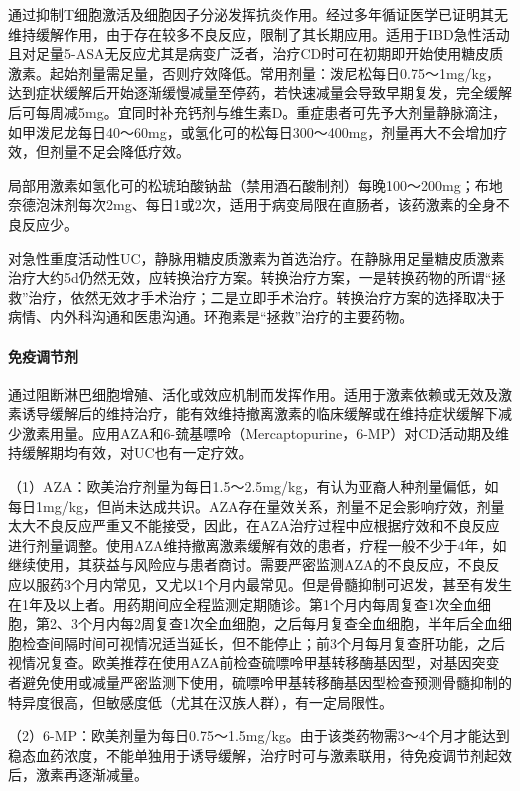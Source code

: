 通过抑制T细胞激活及细胞因子分泌发挥抗炎作用。经过多年循证医学已证明其无维持缓解作用，由于存在较多不良反应，限制了其长期应用。适用于IBD急性活动且对足量5-ASA无反应尤其是病变广泛者，治疗CD时可在初期即开始使用糖皮质激素。起始剂量需足量，否则疗效降低。常用剂量：泼尼松每日0.75～1mg/kg，达到症状缓解后开始逐渐缓慢减量至停药，若快速减量会导致早期复发，完全缓解后可每周减5mg。宜同时补充钙剂与维生素D。重症患者可先予大剂量静脉滴注，如甲泼尼龙每日40～60mg，或氢化可的松每日300～400mg，剂量再大不会增加疗效，但剂量不足会降低疗效。

局部用激素如氢化可的松琥珀酸钠盐（禁用酒石酸制剂）每晚100～200mg；布地奈德泡沫剂每次2mg、每日1或2次，适用于病变局限在直肠者，该药激素的全身不良反应少。

对急性重度活动性UC，静脉用糖皮质激素为首选治疗。在静脉用足量糖皮质激素治疗大约5d仍然无效，应转换治疗方案。转换治疗方案，一是转换药物的所谓“拯救”治疗，依然无效才手术治疗；二是立即手术治疗。转换治疗方案的选择取决于病情、内外科沟通和医患沟通。环孢素是“拯救”治疗的主要药物。
\paragraph{免疫调节剂}

通过阻断淋巴细胞增殖、活化或效应机制而发挥作用。适用于激素依赖或无效及激素诱导缓解后的维持治疗，能有效维持撤离激素的临床缓解或在维持症状缓解下减少激素用量。应用AZA和6-巯基嘌呤（Mercaptopurine，6-MP）对CD活动期及维持缓解期均有效，对UC也有一定疗效。

（1）AZA：欧美治疗剂量为每日1.5～2.5mg/kg，有认为亚裔人种剂量偏低，如每日1mg/kg，但尚未达成共识。AZA存在量效关系，剂量不足会影响疗效，剂量太大不良反应严重又不能接受，因此，在AZA治疗过程中应根据疗效和不良反应进行剂量调整。使用AZA维持撤离激素缓解有效的患者，疗程一般不少于4年，如继续使用，其获益与风险应与患者商讨。需要严密监测AZA的不良反应，不良反应以服药3个月内常见，又尤以1个月内最常见。但是骨髓抑制可迟发，甚至有发生在1年及以上者。用药期间应全程监测定期随诊。第1个月内每周复查1次全血细胞，第2、3个月内每2周复查1次全血细胞，之后每月复查全血细胞，半年后全血细胞检查间隔时间可视情况适当延长，但不能停止；前3个月每月复查肝功能，之后视情况复查。欧美推荐在使用AZA前检查硫嘌呤甲基转移酶基因型，对基因突变者避免使用或减量严密监测下使用，硫嘌呤甲基转移酶基因型检查预测骨髓抑制的特异度很高，但敏感度低（尤其在汉族人群），有一定局限性。

（2）6-MP：欧美剂量为每日0.75～1.5mg/kg。由于该类药物需3～4个月才能达到稳态血药浓度，不能单独用于诱导缓解，治疗时可与激素联用，待免疫调节剂起效后，激素再逐渐减量。

